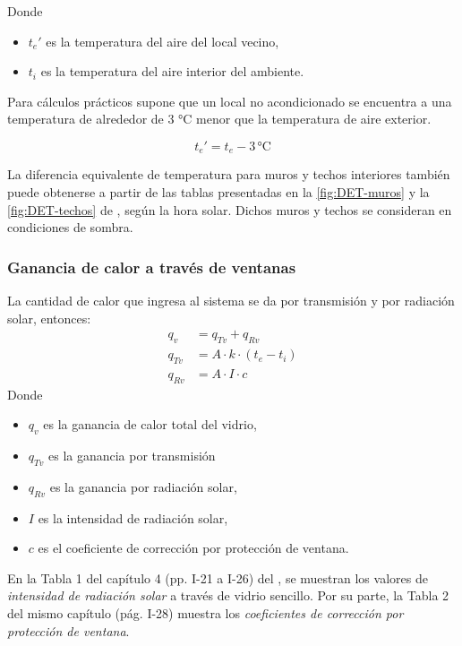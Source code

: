 Donde\begin{itemize}
	\item $t_e'$ es la temperatura del aire del local vecino,
	\item $t_i$ es la temperatura del aire interior del ambiente.
\end{itemize}

Para cálculos prácticos \textcite{quadri2020} supone que un local no acondicionado se encuentra a una temperatura de alrededor de 3 °C menor que la temperatura de aire exterior.

\begin{equation}
	t_e' = t_e - 3\, \text{°C}
\end{equation}

La diferencia equivalente de temperatura para muros y techos interiores también puede obtenerse a partir de las tablas presentadas en la \autoref{fig:DET-muros} y la \autoref{fig:DET-techos} de \textcite{carrier2009}, según la hora solar. Dichos muros y techos se consideran en condiciones de sombra. 

\subsubsection{Ganancia de calor a través de ventanas}

La cantidad de calor que ingresa al sistema se da por transmisión y por radiación solar, entonces:
\begin{align}
	q_v &= q_{Tv} + q_{Rv}\\
	q_{Tv} &= A \cdot k \cdot (t_e - t_i)\\
	q_{Rv} &= A \cdot I \cdot c 
\end{align}
Donde \begin{itemize}
	\item $q_v$ es la ganancia de calor total del vidrio,
	\item $q_{Tv}$ es la ganancia por transmisión
	\item $q_{Rv}$ es la ganancia por radiación solar,
	\item $I$ es la intensidad de radiación solar,
	\item $c$ es el coeficiente de corrección por protección de ventana.
\end{itemize}       

En la Tabla 1 del capítulo 4 (pp. I-21 a I-26) del , se muestran los valores de \emph{intensidad de radiación solar} a través de vidrio sencillo. Por su parte, la Tabla 2 del mismo capítulo (pág. I-28) muestra  los \emph{coeficientes de corrección por protección de ventana}. 

